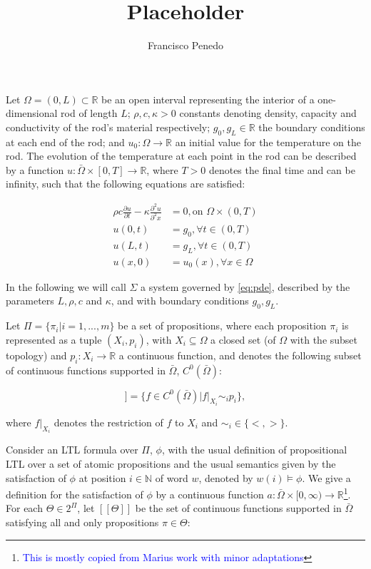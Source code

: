 \documentclass{article}
\title{Placeholder}
\author{Francisco Penedo}
\newcommand*{\R}{\mathbb{R}}
\newcommand*{\N}{\mathbb{N}}
\newcommand*{\psat}[1]{[[#1]]}
\newcommand*{\fran}[1]{\textcolor{blue}{#1}}
\begin{document}
Let $\Omega = (0, L) \subset \R$ be an open interval representing the interior
of a one-dimensional rod of length $L$; $\rho, c, \kappa > 0$ 
constants denoting density, capacity and conductivity of the rod's material respectively;
$g_0, g_L \in \R$ the boundary conditions at each end of the rod; and $u_0 :
\Omega \rightarrow \R$ an initial value for the temperature on the rod. 
The evolution of the temperature at
each point in the rod can be described by a function $u : \bar \Omega \times [0,
T] \rightarrow \R$, where $T > 0$ denotes the final time and can be infinity, 
such that the following equations are satisfied:

\begin{equation}\label{eq:pde}
    \begin{aligned}
        \rho c \frac{\partial u}{\partial t} - \kappa \frac{\partial^2
        u}{\partial^2 x} &= 0, \text{on } \Omega \times (0, T) \\
        u(0, t) &= g_0, \forall t \in (0, T) \\
        u(L, t) &= g_L, \forall t \in (0, T) \\
        u(x, 0) &= u_0(x), \forall x \in \Omega
    \end{aligned}
\end{equation}

In the following we will call $\Sigma$ a system governed by \eqref{eq:pde},
described by the parameters $L, \rho, c$ and $\kappa$, and with boundary
conditions $g_0, g_L$.

Let $\Pi = \{\pi_i | i = 1, ..., m\}$ be a set of propositions, where each
proposition $\pi_i$ is represented as a tuple $(X_i, p_i)$, with $X_i \subseteq
\Omega$ a closed set (of $\Omega$ with the subset topology) and $p_i : X_i
\rightarrow \R$ a continuous function, and denotes the following subset of
continuous functions supported in $\bar\Omega$, $C^0(\bar\Omega)$:

\begin{equation}
    \psat{\pi_i} = \{ f \in C^0(\bar\Omega) | \left.f\right|_{X_i} \sim_i p_i \},
\end{equation}

where $\left.f\right|_{X_i}$ denotes the restriction of $f$ to $X_i$ and $\sim_i
\in \{<, >\}$.

Consider an LTL formula over $\Pi$, $\phi$, with the usual definition of
propositional LTL over a set of atomic propositions and the usual semantics
given by the satisfaction of $\phi$ at position $i \in \N$ of word $w$, denoted
by $w(i) \models \phi$. We give a definition for the satisfaction of $\phi$ by a
continuous function $a : \bar \Omega \times [0, \infty) \rightarrow
\R$\footnote{\fran{This is mostly copied from Marius work with minor
adaptations}}. For each $\Theta \in 2^\Pi$, let $\psat{\Theta}$ be the set of
continuous functions supported in $\bar\Omega$ satisfying all and only
propositions $\pi \in \Theta$:
\end{document}
